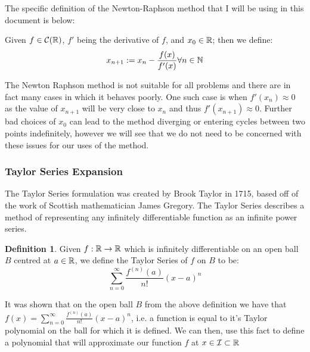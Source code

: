 The specific definition of the Newton-Raphson method that I will be using in this document is below:

\begin{Newton Method}
\label{DEF_"Newton-Raphson Method"}
Given \(f \in \mathcal{C}(\mathbb{R})\), \(f'\) being the derivative of \(f\), and \(x_0 \in \mathbb{R}\); then we define:
\begin{displaymath}
	x_{n+1} := x_n - \frac{f(x)}{f'(x)} \forall n \in \mathbb{N}
\end{displaymath}
\end{Newton Method}

The Newton Raphson method is not suitable for all problems and there are in fact many cases in which it behaves poorly. One such case is when \(f'(x_n) \approx 0\) as the value of \(x_{n+1}\) will be very close to \(x_n\) and thus \(f'(x_{n+1}) \approx 0\). Further bad choices of \(x_0\) can lead to the method diverging or entering cycles between two points indefinitely, however we will see that we do not need to be concerned with these issues for our uses of the method.

\subsubsection{Taylor Series Expansion}
\label{SUBSUB_"Taylor Series"}
\theoremstyle{definition}
\newtheorem{Taylor Series}{Definition}[subsubsection]
\newtheorem{Taylor Polynomial}[Taylor Series]{Definition}

The Taylor Series formulation was created by Brook Taylor in 1715, based off of the work of Scottish mathematician James Gregory. The Taylor Series describes a method of representing any infinitely differentiable function as an infinite power series.

\begin{Taylor Series}
\label{DEF_"Taylor Series"}
Given \(f : \mathbb{R} \to \mathbb{R}\) which is infinitely differentiable on an open ball \(B\) centred at \(a \in \mathbb{R}\), we define the Taylor Series of \(f\) on \(B\) to be:
\[\sum_{n=0}^{\infty} \frac{f^{(n)}(a)}{n!}(x-a)^n\]
\end{Taylor Series}

It was shown that on the open ball \(B\) from the above definition we have that \(f(x) = \sum_{n=0}^{\infty} \frac{f^{(n)}(a)}{n!}(x-a)^n\), i.e. a function is equal to it's Taylor polynomial on the ball for which it is defined. We can then, use this fact to define a polynomial that will approximate our function \(f\) at \(x \in \mathcal{I} \subset \mathbb{R}\)

